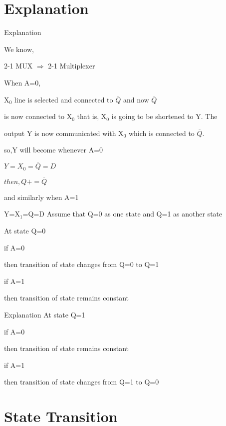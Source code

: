 \documentclass{beamer}
\begin{document}
\section{Explanation}
\begin{frame}{Explanation}


    We know,
  
  2-1 MUX $\Longrightarrow$ 2-1 Multiplexer
  
  When   A=0,
  
  X$_0$   line  is  selected  and  connected  to $\overline{Q}$  and now  $\overline{Q}$
 
 is  now  connected  to  X$_0$  that  is,  X$_0$  is  going  to  be   shortened to  Y.  The
 
 output  Y  is  now  communicated  with  X$_0$  which  is  connected  to $\overline{Q}$.
  
  so,Y will become  whenever A=0
  
    $ Y=X_0=\overline{Q}=D$
     
    $ then,Q+  =\overline{Q}$
    
    and  similarly  when  A=1
    
    Y=X$_1$=Q=D
   Assume   that  Q=0  as one  state and Q=1  as another state
   
   At  state Q=0
   
    if  A=0
    
    then transition of state changes from Q=0 to Q=1
    
    if A=1
    
    then transition of state remains constant
    

\end{frame}

\begin{frame}{Explanation}
       At  state  Q=1
   
    if  A=0
    
    then transition of state remains constant
    
    if A=1
    
    then transition of state changes from Q=1 to Q=0
\end{frame}

    \section{State Transition}  
    
\end{document}
